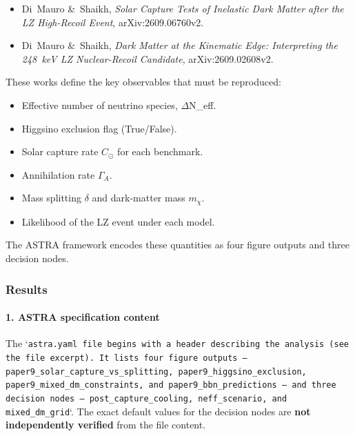 \documentclass[11pt,a4paper]{article}
\begin{document}
\begin{itemize}
  \item Di~Mauro \&~Shaikh, \textit{Solar Capture Tests of Inelastic Dark Matter after the LZ High-Recoil Event}, arXiv:2609.06760v2.
  \item Di~Mauro \&~Shaikh, \textit{Dark Matter at the Kinematic Edge: Interpreting the 248~keV LZ Nuclear-Recoil Candidate}, arXiv:2609.02608v2.
\end{itemize}
These works define the key observables that must be reproduced:

\begin{itemize}
  \item Effective number of neutrino species, $\Delta$N\_eff.
  \item Higgsino exclusion flag (True/False).
  \item Solar capture rate $C_{\odot}$ for each benchmark.
  \item Annihilation rate $\Gamma_{A}$.
  \item Mass splitting $\delta$ and dark-matter mass $m_{\chi}$.
  \item Likelihood of the LZ event under each model.
\end{itemize}
The ASTRA framework encodes these quantities as four figure outputs and three decision nodes.

\subsubsection*{Results}
\paragraph{1. ASTRA specification content}
The `\texttt{astra.yaml}\texttt{ file begins with a header describing the analysis (see the file excerpt)\allowbreak{}. It lists four figure outputs -- }\texttt{paper9\_\allowbreak{}solar\_\allowbreak{}capture\_\allowbreak{}vs\_\allowbreak{}splitting}\texttt{,\allowbreak{} }\texttt{paper9\_\allowbreak{}higgsino\_\allowbreak{}exclusion}\texttt{,\allowbreak{} }\texttt{paper9\_\allowbreak{}mixed\_\allowbreak{}dm\_\allowbreak{}constraints}\texttt{,\allowbreak{} and }\texttt{paper9\_\allowbreak{}bbn\_\allowbreak{}predictions}\texttt{ -- and three decision nodes -- }\texttt{post\_\allowbreak{}capture\_\allowbreak{}cooling}\texttt{,\allowbreak{} }\texttt{neff\_\allowbreak{}scenario}\texttt{,\allowbreak{} and }\texttt{mixed\_\allowbreak{}dm\_\allowbreak{}grid}`. The exact default values for the decision nodes are \textbf{not independently verified} from the file content.
\end{document}
